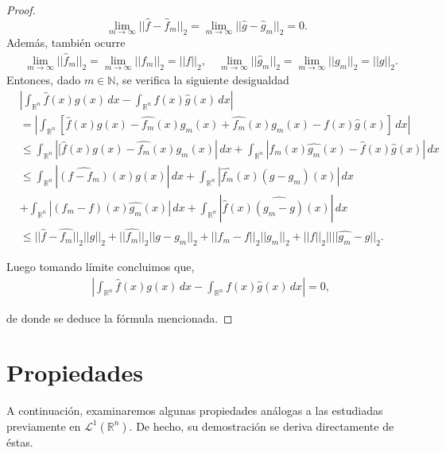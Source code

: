 \begin{proof}
\begin{equation}
    \lim_{m \rightarrow \infty}||\widehat{f}-\widehat{f}_m||_2 = \lim_{m \rightarrow \infty}||\widehat{g}-\widehat{g}_m||_2 =0.
\end{equation}
Además, también ocurre
\begin{align}
&\lim_{m \rightarrow \infty}||\widehat{f}_m||_2 = \lim_{m \rightarrow \infty}||f_m||_2 =||f||_2, \
&\lim_{m \rightarrow \infty}||\widehat{g}_m||_2 =\lim_{m \rightarrow \infty}||g_m||_2 = ||g||_2.
\end{align}
Entonces, dado $m \in \mathbb{N}$, se verifica la siguiente desigualdad
\begin{equation}
\begin{aligned}
&\left| \int_{\mathbb{R}^n}\widehat{f}(x)g(x) \, dx - \int_{\mathbb{R}^n}f(x)\widehat{g}(x) \, dx\right| \\
&= \left| \int_{\mathbb{R}^n}\left[\widehat{f}(x)g(x) -\widehat{f_m}(x)g_m(x)+\widehat{f_m}(x)g_m(x)-f(x)\widehat{g}(x) \right]\, dx \right| \\
&\leq \int_{\mathbb{R}^n}\left|[\widehat{f}(x)g(x) -\widehat{f_m}(x)g_m(x) \right| \, dx+\int_{\mathbb{R}^n}\left|f_m(x)\widehat{g_m}(x) -\widehat{f}(x)\widehat{g}(x)\right| \, dx \\
&\leq \int_{\mathbb{R}^n}\left|\widehat{(f-f_m)}(x)g(x)\right| \, dx + \int_{\mathbb{R}^n} \left|\widehat{f_m}(x)(g-g_m)(x)\right|\, dx \\
&+\int_{\mathbb{R}^n}\left|(f_m-f)(x)\widehat{g_m}(x)\right| \, dx +\int_{\mathbb{R}^n} \left|\widehat{f}(x)\widehat{(g_m-g)}(x)\right|\, dx \\ 
&\leq ||\widehat{f}-\widehat{f_m}||_2||g||_2+||\widehat{f_m}||_2||g-g_m||_2 
+||f_m-f||_2||g_m||_2+||f||_2||||\widehat{g_m}-\widehat{g}||_2.
\end{aligned}
\end{equation}

Luego tomando límite concluimos que, 
\begin{equation}
\begin{aligned}
&\left| \int_{\mathbb{R}^n}\widehat{f}(x)g(x) \, dx - \int_{\mathbb{R}^n}f(x)\widehat{g}(x) \, dx\right|  = 0,
\end{aligned}
\end{equation}

de donde se deduce la fórmula mencionada.
\end{proof}




\section{Propiedades}
A continuación, examinaremos algunas propiedades análogas a las estudiadas previamente en $\mathscr{L}^1(\mathbb{R}^n)$. De hecho, su demostración se deriva directamente de éstas.



